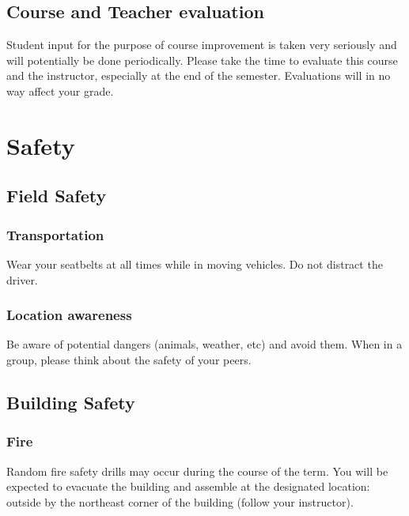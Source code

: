 \documentclass[11pt,]{article}
\begin{document}
\hypertarget{course-and-teacher-evaluation}{%
\subsection{Course and Teacher
evaluation}\label{course-and-teacher-evaluation}}

Student input for the purpose of course improvement is taken very
seriously and will potentially be done periodically. Please take the
time to evaluate this course and the instructor, especially at the end
of the semester. Evaluations will in no way affect your grade.

\hypertarget{safety}{%
\section{Safety}\label{safety}}

\hypertarget{field-safety}{%
\subsection{Field Safety}\label{field-safety}}

\hypertarget{transportation}{%
\subsubsection{Transportation}\label{transportation}}

Wear your seatbelts at all times while in moving vehicles. Do not
distract the driver.

\hypertarget{location-awareness}{%
\subsubsection{Location awareness}\label{location-awareness}}

Be aware of potential dangers (animals, weather, etc) and avoid them.
When in a group, please think about the safety of your peers.

\hypertarget{building-safety}{%
\subsection{Building Safety}\label{building-safety}}

\hypertarget{fire}{%
\subsubsection{Fire}\label{fire}}

Random fire safety drills may occur during the course of the term. You
will be expected to evacuate the building and assemble at the designated
location: outside by the northeast corner of the building (follow your
instructor).
\end{document}
